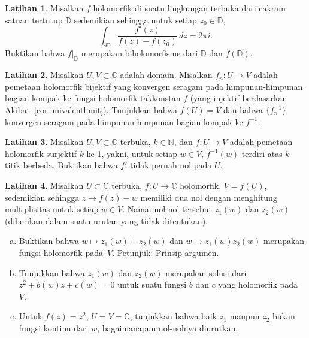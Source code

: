 \documentclass[12pt,openany]{book}
\newcommand{\C}{{\mathbb{C}}}
\newcommand{\N}{{\mathbb{N}}}
\newcommand{\D}{{\mathbb{D}}}
\theoremstyle{plain}
\theoremstyle{remark}
\theoremstyle{definition}
\newenvironment{exbox}{%
    \def\FrameCommand{\vrule width 1pt \relax\hspace{10pt}}%
    \MakeFramed{\advance\hsize-\width\FrameRestore}%
}{%
    \endMakeFramed
}
\newenvironment{exparts}{%
    \leavevmode\begin{enumerate}[a),noitemsep,topsep=0pt,parsep=0pt,partopsep=0pt]
}{%
    \end{enumerate}
}
\theoremstyle{exercise}
\newtheorem{exercise}{Latihan}[section]
\theoremstyle{example}
\newcommand{\corref}[1]{\hyperref[#1]{Akibat~\ref*{#1}}}
\begin{document}
\begin{exbox}
\begin{exercise}
Misalkan $f$ holomorfik di suatu lingkungan terbuka dari cakram satuan tertutup
$\overline{\D}$ sedemikian sehingga untuk setiap $z_0 \in \D$,
\begin{equation*}
\int_{\partial \D}
\frac{f'(z)}{f(z)-f(z_0)}
\, dz = 2\pi i .
\end{equation*}
Buktikan bahwa $f|_{\D}$ merupakan biholomorfisme dari $\D$ dan $f(\D)$.
\end{exercise}

\begin{exercise}
Misalkan $U,V \subset \C$ adalah domain.
Misalkan $f_n \colon U \to V$ adalah pemetaan holomorfik bijektif
yang konvergen seragam pada himpunan-himpunan bagian kompak ke fungsi holomorfik
takkonstan $f$ (yang injektif berdasarkan \corref{cor:univalentlimit}).
Tunjukkan bahwa $f(U) = V$ dan bahwa $\bigl\{ f_n^{-1} \bigr\}$ konvergen seragam pada
himpunan-himpunan bagian kompak ke $f^{-1}$.
\end{exercise}

\begin{exercise} \label{exercise:ktoone}
Misalkan $U,V \subset \C$ terbuka, $k \in \N$, dan $f \colon U \to V$ adalah pemetaan holomorfik
surjektif $k$-ke-1,
yakni, untuk setiap $w \in V$, $f^{-1}(w)$ terdiri atas $k$ titik berbeda.
Buktikan bahwa $f'$ tidak pernah nol pada $U$.
\end{exercise}

\begin{exercise}
Misalkan $U \subset \C$ terbuka, $f \colon U \to \C$
holomorfik, $V = f(U)$, sedemikian sehingga $z \mapsto f(z)-w$
memiliki dua nol dengan menghitung multiplisitas untuk setiap $w \in V$.
Namai nol-nol tersebut
$z_1(w)$ dan $z_2(w)$ (diberikan dalam suatu urutan yang tidak ditentukan).
\begin{exparts}
\item
Buktikan bahwa $w \mapsto z_1(w)+z_2(w)$ dan 
$w \mapsto z_1(w)z_2(w)$ merupakan fungsi holomorfik pada~$V$.
Petunjuk: Prinsip argumen.
\item
Tunjukkan bahwa $z_1(w)$ dan $z_2(w)$ merupakan solusi dari
$z^2 + b(w) z + c(w) = 0$ untuk suatu fungsi $b$ dan $c$ yang holomorfik pada~$V$.
\item
Untuk $f(z) = z^2$, $U = V = \C$, tunjukkan bahwa baik $z_1$ maupun $z_2$ bukan fungsi
kontinu dari $w$,
bagaimanapun nol-nolnya diurutkan.
\end{exparts}
\end{exercise}
\end{exbox}
\end{document}
